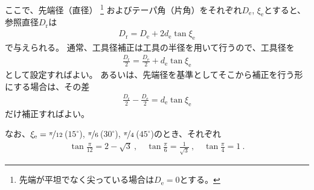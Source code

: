 ここで、先端径（直径）
\footnote{先端が平坦でなく尖っている場合は$D_\mathrm e = 0$とする。}
およびテーパ角（片角）をそれぞれ$D_\mathrm e$, $\xi_\mathrm e$とすると、参照直径$D_\mathrm r$は
\begin{align*}
  D_\mathrm r = D_\mathrm e+2d_\mathrm e\tan\xi_\mathrm e
\end{align*}
で与えられる。
通常、工具径補正は工具の半径を用いて行うので、工具径を
\begin{align*}
  \frac{D_\mathrm r}2 = \frac{D_\mathrm e}2+d_\mathrm e\tan\xi_\mathrm e
\end{align*}
として設定すればよい。
あるいは、先端径を基準としてそこから補正を行う形にする場合は、その差
\begin{align*}
  \frac{D_\mathrm r}2-\frac{D_\mathrm e}2 = d_\mathrm e\tan\xi_\mathrm e
\end{align*}
だけ補正すればよい。
\begin{hosoku}
なお、$\xi_\mathrm e = \nicefrac\pi{12}$\,($15^\circ$), $\nicefrac\pi6$\,($30^\circ$), $\nicefrac\pi4$\,($45^\circ$)のとき、それぞれ
\begin{align*}
  \tan\frac\pi{12} = 2-\sqrt3\ , \quad
  \tan\frac\pi6 = \frac1{\sqrt3}\ , \quad
  \tan\frac\pi4 = 1\ .
\end{align*}
\end{hosoku}



